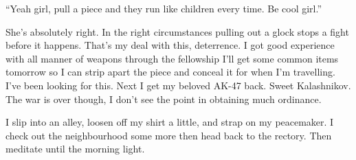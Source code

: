 ``Yeah girl, pull a piece and they run like children every time. Be cool girl.''

She's absolutely right. In the right circumstances pulling out a glock stops a fight before it happens. That's my deal with this, deterrence. I got good experience with all manner of weapons through the fellowship I'll get some common items tomorrow so I can strip apart the piece and conceal it for when I'm travelling. I've been looking for this. Next I get my beloved AK-47 back. Sweet Kalashnikov. The war is over though, I don't see the point in obtaining much ordinance.

I slip into an alley, loosen off my shirt a little, and strap on my peacemaker. I check out the neighbourhood some more then head back to the rectory. Then meditate until the morning light.
